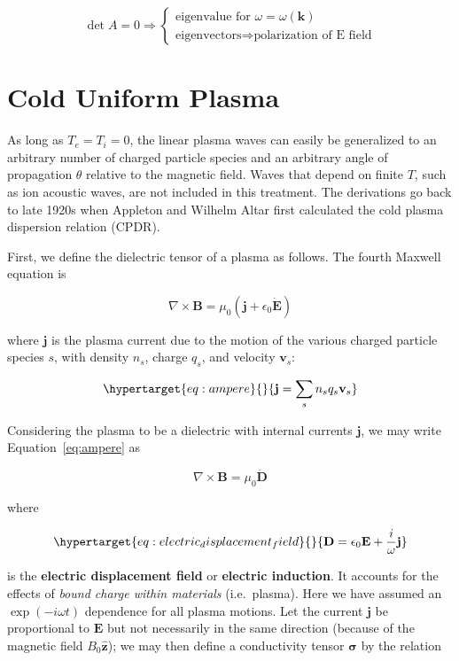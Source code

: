 \documentclass[
  notoc %
]{tufte-book}
\begin{document}
\[
\det{A} = 0 \Rightarrow
\begin{cases}
\text{eigenvalue for } \omega = \omega(\mathbf{k}) \\
\text{eigenvectors} \Rightarrow \text{polarization of E field}
\end{cases}
\]

\hypertarget{sec:CPDR}{%
\section{Cold Uniform Plasma}\label{sec:CPDR}}

As long as \(T_e = T_i = 0\), the linear plasma waves can easily be
generalized to an arbitrary number of charged particle species and an
arbitrary angle of propagation \(\theta\) relative to the magnetic
field. Waves that depend on finite \(T\), such as ion acoustic waves,
are not included in this treatment. The derivations go back to late
1920s when Appleton and Wilhelm Altar first calculated the cold plasma
dispersion relation (CPDR).

First, we define the dielectric tensor of a plasma as follows. The
fourth Maxwell equation is

\[
\nabla\times\mathbf{B} = \mu_0(\mathbf{j} + \epsilon_0\dot{\mathbf{E}})
\]

where \(\mathbf{j}\) is the plasma current due to the motion of the
various charged particle species \(s\), with density \(n_s\), charge
\(q_s\), and velocity \(\mathbf{v}_s\):

\begin{equation}\protect\hypertarget{eq:ampere}{}{
\mathbf{j} = \sum_s n_s q_s\mathbf{v}_s
}\label{eq:ampere}\end{equation}

Considering the plasma to be a dielectric with internal currents
\(\mathbf{j}\), we may write Equation~\ref{eq:ampere} as

\[
\nabla\times\mathbf{B} = \mu_0\dot{\mathbf{D}}
\]

where

\begin{equation}\protect\hypertarget{eq:electric_displacement_field}{}{
\mathbf{D} = \epsilon_0 \mathbf{E} + \frac{i}{\omega}\mathbf{j}
}\label{eq:electric_displacement_field}\end{equation}

is the \textbf{electric displacement field} or \textbf{electric
induction}. It accounts for the effects of \emph{bound charge within
materials} (i.e.~plasma). Here we have assumed an \(\exp(-i\omega t)\)
dependence for all plasma motions. Let the current \(\mathbf{j}\) be
proportional to \(\mathbf{E}\) but not necessarily in the same direction
(because of the magnetic field \(B_0\hat{\mathbf{z}}\)); we may then
define a conductivity tensor \(\pmb{\sigma}\) by the relation
\end{document}
